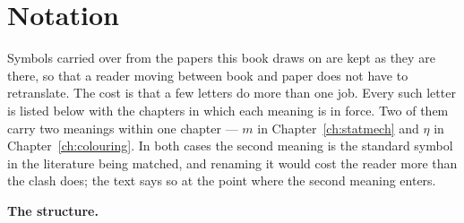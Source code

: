 \chapter*{Notation}

Symbols carried over from the papers this book draws on are kept as they are
there, so that a reader moving between book and paper does not have to
retranslate. The cost is that a few letters do more than one job. Every such
letter is listed below with the chapters in which each meaning is in force. Two
of them carry two meanings within one chapter --- $m$ in
Chapter~\ref{ch:statmech} and $\eta$ in Chapter~\ref{ch:colouring}. In both
cases the second meaning is the standard symbol in the literature being matched,
and renaming it would cost the reader more than the clash does; the text says so
at the point where the second meaning enters.

\medskip
\noindent\textbf{The structure.}

